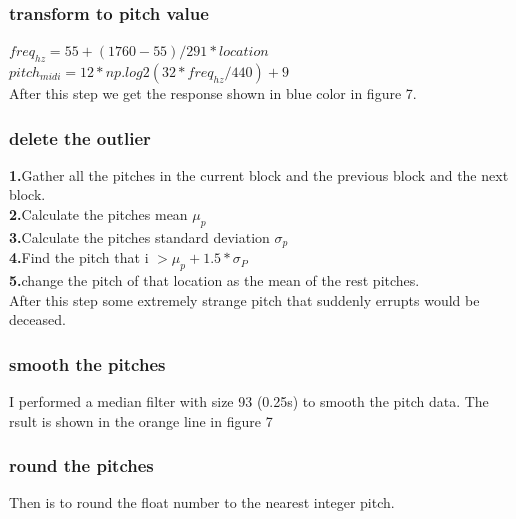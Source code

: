 \documentclass[twoside]{article}
\begin{document}
\subsubsection{transform to pitch value}
$freq_{hz} = 55 + (1760 - 55) / 291 * location$\\
$pitch_{midi} = 12 * np.log2(32 * freq_{hz} / 440) + 9$\\

\noindent After this step we get the response shown in blue color in figure 7. 

\subsubsection{delete the outlier}
\textbf{1.}Gather all the pitches in the current block and the previous block and the next block. \\
\textbf{2.}Calculate the pitches mean $\mu_p$\\
\textbf{3.}Calculate the pitches standard deviation $\sigma_p$\\
\textbf{4.}Find the pitch that i $> \mu_p + 1.5 * \sigma_P$\\
\textbf{5.}change the pitch of that location as the mean of the rest pitches.\\

\noindent After this step some extremely strange pitch that suddenly errupts would be deceased.\\

\subsubsection{smooth the pitches}
I performed a median filter with size 93 (0.25s) to smooth the pitch data. The rsult is shown in the orange line in figure 7\\

\subsubsection{round the pitches}
Then is to round the float number to the nearest integer pitch.
\end{document}
